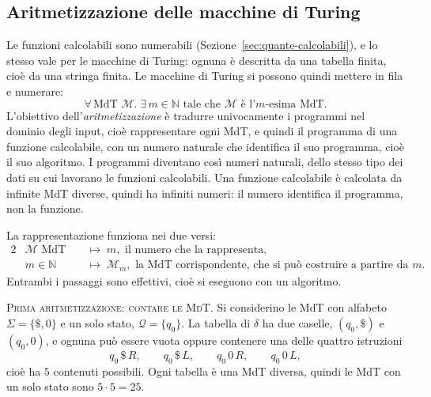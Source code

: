 \documentclass[a4paper, 11pt, oneside]{book}
\theoremstyle{formale}
\begin{document}
    \subsection{Aritmetizzazione delle macchine di Turing}
    \label{sec:aritmetizzazione}
    Le funzioni calcolabili sono numerabili (Sezione~\ref{sec:quante-calcolabili}), e lo
    stesso vale per le macchine di Turing: ognuna \`e descritta da una tabella finita,
    cio\`e da una stringa finita. Le macchine di Turing si possono quindi mettere in fila
    e numerare:
    \begin{equation*}
        \forall\, \text{MdT } \mathcal{M}.\; \exists\, m \in \mathbb{N} \text{ tale che }
        \mathcal{M} \text{ \`e l'$m$-esima MdT}.
    \end{equation*}
    L'obiettivo dell'\emph{aritmetizzazione} \`e tradurre univocamente i programmi nel
    dominio degli input, cio\`e rappresentare ogni MdT, e quindi il programma di una
    funzione calcolabile, con un numero naturale che identifica il suo programma, cio\`e
    il suo algoritmo. I programmi diventano cos\`i numeri naturali, dello stesso tipo dei
    dati su cui lavorano le funzioni calcolabili. Una funzione calcolabile \`e
    calcolata da infinite MdT diverse, quindi ha infiniti numeri: il numero identifica il
    programma, non la funzione.

    La rappresentazione funziona nei due versi:
    \begin{alignat*}{2}
        &\mathcal{M} \text{ MdT} &&\;\longmapsto\; m, \text{ il numero che la rappresenta}, \\
        &m \in \mathbb{N} &&\;\longmapsto\; \mathcal{M}_m, \text{ la MdT corrispondente,
            che si pu\`o costruire a partire da } m.
    \end{alignat*}
    Entrambi i passaggi sono effettivi, cio\`e si eseguono con un algoritmo.

    \medskip
    \textsc{Prima aritmetizzazione: contare le MdT}. Si considerino le MdT con alfabeto
    $\Sigma = \{\$, 0\}$ e un solo stato, $\mathcal{Q} = \{q_0\}$. La tabella di $\delta$
    ha due caselle, $(q_0, \$)$ e $(q_0, 0)$, e ognuna pu\`o essere vuota oppure contenere
    una delle quattro istruzioni
    \begin{equation*}
        q_0\,\$\,R, \qquad q_0\,\$\,L, \qquad q_0\,0\,R, \qquad q_0\,0\,L,
    \end{equation*}
    cio\`e ha $5$ contenuti possibili. Ogni tabella \`e una MdT diversa, quindi le MdT
    con un solo stato sono $5 \cdot 5 = 25$.
\end{document}
